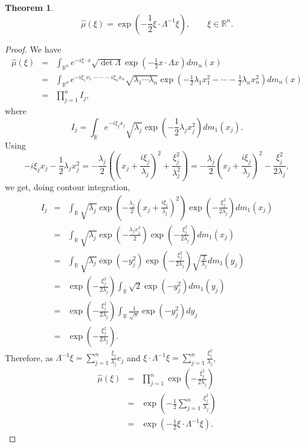 \documentclass{article}
\theoremstyle{definition}
\newtheorem{theorem}{Theorem}
\theoremstyle{definition}
\begin{document}
\begin{theorem}
\[
\hat{\mu}(\xi)=\exp\left(-\frac{1}{2} \xi \cdot \Lambda^{-1}\xi\right), \qquad \xi \in \mathbb{R}^n.
\]
\end{theorem}
\begin{proof}
We have
\begin{eqnarray*}
\hat{\mu}(\xi)&=&\int_{\mathbb{R}^n} e^{-i\xi \cdot x} \sqrt{\det \Lambda} \exp\left(-\frac{1}{2} x\cdot \Lambda x\right) dm_n(x)\\
&=&\int_{\mathbb{R}^d} e^{-i\xi_1 x_1-\cdots-i\xi_n x_n} \sqrt{\lambda_1 \cdots \lambda_n} \exp\left(-\frac{1}{2}\lambda_1 x_1^2 - \cdots - \frac{1}{2}\lambda_n
x_n^2 \right) dm_n(x)\\
&=&\prod_{j=1}^n I_j,
\end{eqnarray*}
where
\[
I_j=\int_\mathbb{R} e^{-i\xi_j x_j} \sqrt{\lambda_j} \exp\left(-\frac{1}{2}\lambda_j x_j^2\right) dm_1(x_j).
\]
Using
\[
-i\xi_j x_j-\frac{1}{2}\lambda_jx_j^2 = -\frac{\lambda_j}{2} \left( \left(x_j+\frac{i\xi_j}{\lambda_j}\right)^2 + \frac{\xi_j^2}{\lambda_j^2} \right)
=-\frac{\lambda_j}{2}  \left(x_j+\frac{i\xi_j}{\lambda_j}\right)^2 - \frac{\xi_j^2}{2\lambda_j},
\]
we get, doing contour integration,
\begin{eqnarray*}
I_j&=&\int_\mathbb{R} \sqrt{\lambda_j} \exp\left(-\frac{\lambda_j}{2} \left(x_j+\frac{i\xi_j}{\lambda_j}\right)^2 \right)
\exp \left( -\frac{\xi_j^2}{2\lambda_j} \right) dm_1(x_j)\\
&=&\int_\mathbb{R} \sqrt{\lambda_j} \exp\left(-\frac{\lambda_j x_j^2}{2} \right)\exp \left( -\frac{\xi_j^2}{2\lambda_j} \right) dm_1(x_j)\\
&=&\int_\mathbb{R} \sqrt{\lambda_j} \exp(-y_j^2) \exp \left( -\frac{\xi_j^2}{2\lambda_j} \right) \sqrt{\frac{2}{\lambda_j}} dm_1(y_j)\\
&=& \exp \left( -\frac{\xi_j^2}{2\lambda_j} \right) \int_\mathbb{R}  \sqrt{2} \exp(-y_j^2) dm_1(y_j)\\
&=& \exp \left( -\frac{\xi_j^2}{2\lambda_j} \right)  \int_{\mathbb{R}} \frac{1}{\sqrt{\pi}} \exp(-y_j^2) dy_j\\
&=& \exp \left( -\frac{\xi_j^2}{2\lambda_j} \right).
\end{eqnarray*}
Therefore, as $\Lambda^{-1}\xi =\sum_{j=1}^n \frac{\xi_j}{\lambda_j}e_j$ and $\xi \cdot \Lambda^{-1}\xi = \sum_{j=1}^n \frac{\xi_j^2}{\lambda_j}$,
\begin{eqnarray*}
\hat{\mu}(\xi)&=&\prod_{j=1}^n  \exp \left( -\frac{\xi_j^2}{2\lambda_j} \right)\\
&=&\exp\left(-\frac{1}{2} \sum_{j=1}^n \frac{\xi_j^2}{\lambda_j}\right)\\
&=&\exp\left(-\frac{1}{2} \xi \cdot \Lambda^{-1}\xi\right).
\end{eqnarray*}
\end{proof}
\end{document}
